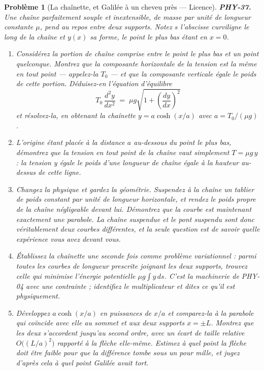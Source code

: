 \documentclass[11pt]{article}
\newtheorem{problem}{Problème}
\begin{document}
\begin{problem}[{La chaînette, et Galilée à un cheveu près --- Licence}]
\textbf{PHY-37.} Une chaîne parfaitement souple et inextensible, de masse par unité de longueur
constante $ \mu $, pend au repos entre deux supports. Notez $ s $ l'abscisse curviligne le
long de la chaîne et $ y(x) $ sa forme, le point le plus bas étant en $ x = 0 $.
\begin{enumerate}
\item[(a)] Considérez la portion de chaîne comprise entre le point le plus bas et un point quelconque.
Montrez que la composante horizontale de la tension est la même en tout point --- appelez-la
$ T_{0} $ --- et que la composante verticale égale le poids de cette portion. Déduisez-en
l'équation d'équilibre
\[ T_{0}\,\frac{d^{2}y}{dx^{2}} \;=\; \mu g \sqrt{1 + \left(\frac{dy}{dx}\right)^{2}} \]
et résolvez-la, en obtenant la chaînette $ y = a\cosh(x/a) $ avec
$ a = T_{0}/(\mu g) $.
\item[(b)] L'origine étant placée à la distance $ a $ au-dessous du point le plus bas, démontrez que
la tension en tout point de la chaîne vaut simplement $ T = \mu g\,y $ : la tension y égale le
poids d'une longueur de chaîne égale à la hauteur au-dessus de cette ligne.
\item[(c)] Changez la physique et gardez la géométrie. Suspendez à la chaîne un tablier de poids
constant par unité de longueur \textit{horizontale}, et rendez le poids propre de la chaîne
négligeable devant lui. Démontrez que la courbe est maintenant exactement une parabole. La chaîne
suspendue et le pont suspendu sont donc véritablement deux courbes différentes, et la seule
question est de savoir quelle expérience vous avez devant vous.
\item[(d)] Établissez la chaînette une seconde fois comme problème variationnel : parmi toutes les
courbes de longueur prescrite joignant les deux supports, trouvez celle qui minimise l'énergie
potentielle $ \mu g \int y \, ds $. C'est la machinerie de PHY-04 avec une contrainte ;
identifiez le multiplicateur et dites ce qu'il est physiquement.
\item[(e)] Développez $ a \cosh(x/a) $ en puissances de $ x/a $ et comparez-la à la parabole qui
coïncide avec elle au sommet et aux deux supports $ x = \pm L $. Montrez que les deux
s'accordent jusqu'au second ordre, avec un écart de taille relative
$ O\bigl((L/a)^{2}\bigr) $ rapporté à la flèche elle-même. Estimez à quel point la flèche doit
être faible pour que la différence tombe sous un pour mille, et jugez d'après cela à quel point
Galilée avait tort.
\end{enumerate}

\end{problem}
\end{document}
